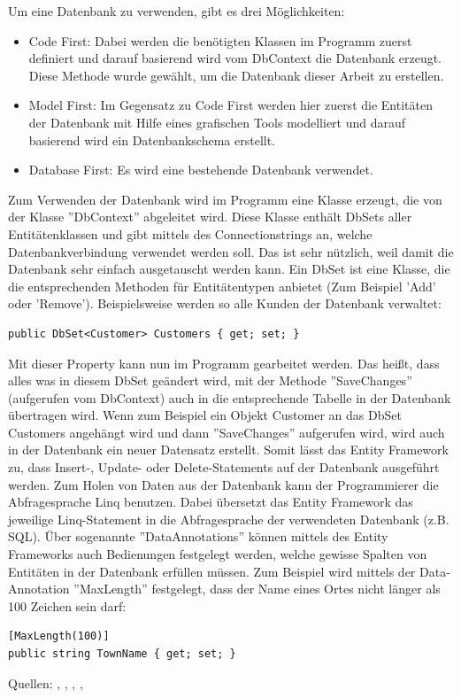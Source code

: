 Um eine Datenbank zu verwenden, gibt es drei Möglichkeiten:
\begin{itemize}
\item Code First: Dabei werden die benötigten Klassen im Programm zuerst definiert und darauf basierend wird vom DbContext die Datenbank erzeugt. Diese Methode wurde gewählt, um die Datenbank dieser Arbeit zu erstellen.
\item Model First: Im Gegensatz zu Code First werden hier zuerst die Entitäten der Datenbank mit Hilfe eines grafischen Tools modelliert und darauf basierend wird ein Datenbankschema erstellt.
\item Database First: Es wird eine bestehende Datenbank verwendet.
\end{itemize}
Zum Verwenden der Datenbank wird im Programm eine Klasse erzeugt, die von der Klasse ''DbContext'' abgeleitet wird. Diese Klasse enthält DbSets aller Entitätenklassen und gibt mittels des Connectionstrings an, welche Datenbankverbindung verwendet werden soll. Das ist sehr nützlich, weil damit die Datenbank sehr einfach ausgetauscht werden kann. Ein DbSet ist eine Klasse, die die entsprechenden Methoden für Entitätentypen anbietet (Zum Beispiel 'Add' oder 'Remove'). \newline Beispielsweise werden so alle Kunden der Datenbank verwaltet: 
\begin{lstlisting}
public DbSet<Customer> Customers { get; set; }
\end{lstlisting}
Mit dieser Property kann nun im Programm gearbeitet werden. Das heißt, dass alles was in diesem DbSet geändert wird, mit der Methode ''SaveChanges'' (aufgerufen vom  DbContext) auch in die entsprechende Tabelle in der Datenbank übertragen wird. Wenn zum Beispiel ein Objekt Customer an das DbSet Customers angehängt wird und dann ''SaveChanges'' aufgerufen wird, wird auch in der Datenbank ein neuer Datensatz erstellt. Somit lässt das Entity Framework zu, dass Insert-, Update- oder Delete-Statements auf der Datenbank ausgeführt werden.
Zum Holen von Daten aus der Datenbank kann der Programmierer die Abfragesprache Linq benutzen. Dabei übersetzt das Entity Framework das jeweilige Linq-Statement in die Abfragesprache der verwendeten Datenbank (z.B. SQL). Über sogenannte ''DataAnnotations'' können mittels des Entity Frameworks auch Bedienungen festgelegt werden, welche gewisse Spalten von Entitäten in der Datenbank erfüllen müssen. Zum Beispiel wird mittels der Data-Annotation ''MaxLength'' festgelegt, dass der Name eines Ortes nicht länger als 100 Zeichen sein darf:
\begin{lstlisting}
[MaxLength(100)]
public string TownName { get; set; }
\end{lstlisting}
Quellen: \cite{wikipedia_entity_2017}, \cite{entityframework_tutorial_what_2018}, \cite{wikipedia_objektrelationale_2016}, \cite{microsoft_entity_connections_2018}, \cite{microsoft_entity_2018}
